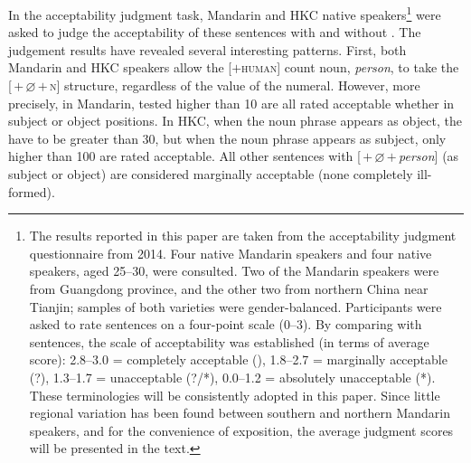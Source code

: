 \documentclass[output=paper]{langsci/langscibook}
\begin{document}
In the acceptability judgment task, Mandarin and \gls{HKC} native
speakers\footnote{The results reported in this paper are taken from the
    acceptability judgment questionnaire from 2014. Four native
    Mandarin speakers and four native 
    speakers, aged 25--30,
    were consulted. Two of the Mandarin speakers were from Guangdong
    province, and the other two from northern China near Tianjin; samples of
    both varieties were gender-balanced. Participants were asked to rate
    sentences on a four-point scale (0--3). By comparing with  sentences,
    the scale of acceptability was established (in terms of average score):
    2.8--3.0 = completely acceptable (), 1.8--2.7 = marginally acceptable (?),
    1.3--1.7 = unacceptable (?/*), 0.0--1.2 = absolutely unacceptable (*). These
    terminologies will be consistently adopted in this paper. Since little
    regional variation has been found between southern and northern Mandarin
speakers, and for the convenience of exposition, the average judgment scores
will be presented in the text.} were asked to judge the acceptability of these
sentences with and without . The judgement results have revealed
several interesting patterns.  First, both Mandarin and \gls{HKC} speakers
allow the [$+$\textsc{human}] count noun, \emph{person}, to take the
[\Num{}\,$+$\,$\varnothing$\,$+$\,\textsc{n}] structure, regardless of the value of
the numeral. However, more precisely, in Mandarin,
tested  higher than 10 are all rated acceptable whether in
subject or object positions.  In \gls{HKC}, when the
noun phrase appears as object, the  have to be greater than 30,
but when the noun phrase appears as subject, only  higher than
100 are rated acceptable. All other sentences with
[\Num{}\,$+$\,${\varnothing}$\,$+$\,\emph{person}] (as subject or object) are
considered marginally acceptable (none completely ill-formed).
\end{document}
